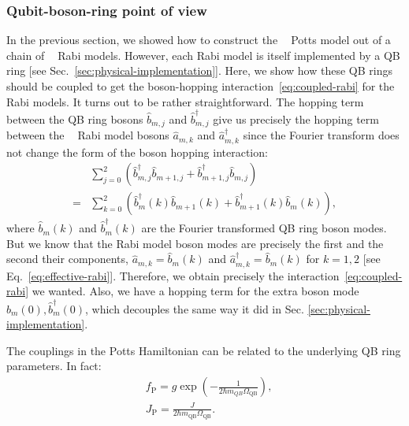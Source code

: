 \documentclass[reprint, aps, prx, amsmath, amssymb, longbibliography, superscriptaddress]{revtex4-2}
\DeclareMathOperator{\Zthree}{\mathbb{Z}_3}
\begin{document}
\subsubsection{Qubit-boson-ring point of view}
\label{sec:underlying-qb-ring}

 In the previous section, we showed how to construct the $\Zthree$ Potts model out of a chain of $\Zthree$ Rabi models. However, each Rabi model is itself implemented by a QB ring [see Sec.~\ref{sec:physical-implementation}]. Here, we show how these QB rings should be coupled to get the boson-hopping interaction~\eqref{eq:coupled-rabi} for the Rabi models. It turns out to be rather straightforward. The hopping term between the QB ring bosons $\hat b_{m,j}$ and $\hat b_{m,j}^{\dagger}$ give us precisely the hopping term between the $\Zthree$ Rabi model bosons $\hat a_{m,k}$ and $\hat a_{m,k}^{\dagger}$ since the Fourier transform does not change the form of the boson hopping interaction:
\begin{equation}
\begin{aligned}
    &\sum\limits_{j=0}^2 \left(\hat b_{m,j}^{\dagger} \hat b_{m+1,j} + \hat b_{m+1,j}^{\dagger} \hat b_{m,j}\right) \\
    =&\sum\limits_{k=0}^{2} \left(\hat b_{m}^{\dagger}(k) \hat b_{m+1}(k) + \hat b_{m+1}^{\dagger}(k) \hat b_{m}(k)\right),
\end{aligned}
\end{equation}
where $\hat b_{m}(k)$ and $\hat b_m^{\dagger}(k)$ are the Fourier transformed QB ring boson modes. But we know that the Rabi model boson modes are precisely the first and the second their components, $\hat a_{m,k} = \hat b_m(k)$ and $\hat a_{m,k}^{\dagger} = \hat b_m(k)$ for $k =1,2$ [see Eq.~\eqref{eq:effective-rabi}]. Therefore, we obtain precisely the interaction~\eqref{eq:coupled-rabi} we wanted. Also, we have a hopping term for the extra boson mode $\hat b_{m}(0), \hat b^{\dagger}_{m}(0)$, which decouples the same way it did in Sec. \ref{sec:physical-implementation}.

The couplings in the Potts Hamiltonian can be related to the underlying QB ring parameters. In fact: 
\begin{equation}
\begin{aligned}
    &f_{\text{P}} = g \exp\left(-\frac{1}{2 \hbar m_{QB} \Omega_{\text{QB}}}\right),\\
    &J_{\text{P}} = \frac{J }{2\hbar m_{\text{QB}} \Omega_{\text{QB}}}.
\end{aligned}
\end{equation}
\end{document}
